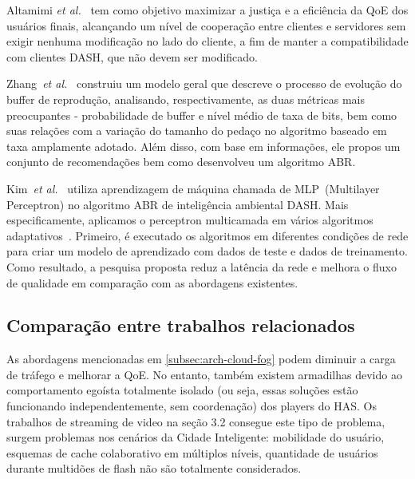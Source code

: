 Altamimi \textit{et al.}~\cite{KreuzbergerWorkshop2016}
tem como objetivo maximizar a justiça e a eficiência da QoE dos usuários finais, alcançando um nível de cooperação entre clientes e servidores sem exigir nenhuma modificação no lado do cliente, a fim de manter a compatibilidade com clientes DASH, que não devem ser modificado.

Zhang~\textit{et al.}~\cite{zhangINFOCOM17} 
construiu um modelo geral que descreve o processo de evolução do buffer de reprodução, analisando, respectivamente, as duas métricas mais preocupantes - probabilidade de buffer e nível médio de taxa de bits, bem como suas relações com a variação do tamanho do pedaço no algoritmo baseado em taxa amplamente adotado. 
Além disso, com base em informações, ele propos um conjunto de recomendações bem como desenvolveu um algoritmo ABR.


Kim~\textit{et al.}~\cite{Kim2018}
utiliza aprendizagem de máquina chamada de MLP~(Multilayer Perceptron) no algoritmo ABR de inteligência ambiental DASH. Mais especificamente, aplicamos o perceptron multicamada em vários algoritmos adaptativos~\cite{}. Primeiro, é executado os algoritmos em diferentes condições de rede para criar um modelo de aprendizado com dados de teste e dados de treinamento. 
Como resultado, a pesquisa proposta reduz a latência da rede e melhora o fluxo de qualidade em comparação com as abordagens existentes.

\subsection{Comparação entre trabalhos relacionados}
\label{subsec:applications}

As abordagens mencionadas em \autoref{subsec:arch-cloud-fog} podem diminuir a carga de tráfego 
e melhorar a QoE. No entanto, também existem armadilhas devido ao comportamento egoísta totalmente isolado (ou seja, essas soluções estão funcionando independentemente, sem coordenação) dos players do HAS.%
Os trabalhos de streaming de video na seção 3.2 consegue este tipo de problema, surgem problemas nos cenários da Cidade Inteligente: mobilidade do usuário, esquemas de cache colaborativo em múltiplos níveis, quantidade de usuários durante multidões de flash não são totalmente considerados. %

